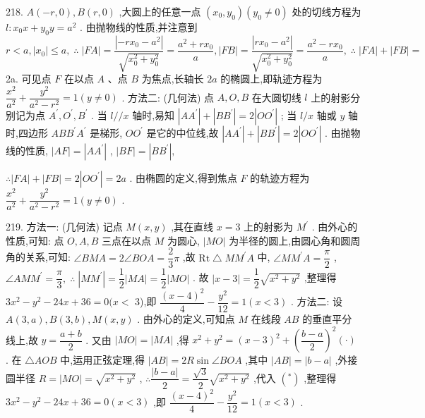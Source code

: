 218. $A\left( {-r,0}\right) ,B\left( {r,0}\right)$ ,大圆上的任意一点 $\left( {{x}_{0},{y}_{0}}\right) \left( {{y}_{0} \neq  0}\right)$ 处的切线方程为 $l : {x}_{0}x + {y}_{0}y = {a}^{2}$ . 由抛物线的性质,并注意到 $r < a,\left| {x}_{0}\right|  \leq  a,\;\therefore \;\left| {FA}\right|  = \dfrac{\left| -r{x}_{0} - {a}^{2}\right| }{\sqrt{{x}_{0}^{2} + {y}_{0}^{2}}} = \dfrac{{a}^{2} + r{x}_{0}}{a},\left| {FB}\right|  = \dfrac{\left| r{x}_{0} - {a}^{2}\right| }{\sqrt{{x}_{0}^{2} + {y}_{0}^{2}}} = \dfrac{{a}^{2} - r{x}_{0}}{a},\;\therefore \;\left| {FA}\right|  + \left| {FB}\right|  =$ 2a. 可见点 $F$ 在以点 $A$ 、点 $B$ 为焦点,长轴长 ${2a}$ 的椭圆上,即轨迹方程为 $\dfrac{{x}^{2}}{{a}^{2}} + \dfrac{{y}^{2}}{{a}^{2} - {r}^{2}} = 1\left( {y \neq  0}\right)$ . 方法二: (几何法) 点 $A,O,B$ 在大圆切线 $l$ 上的射影分别记为点 ${A}^{\prime },{O}^{\prime },{B}^{\prime }$ . 当 $l//x$ 轴时,易知 $\left| {A{A}^{\prime }}\right|  + \left| {B{B}^{\prime }}\right|  = 2\left| {O{O}^{\prime }}\right|$ ; 当 $l/x$ 轴或 $y$ 轴时,四边形 ${AB}{B}^{\prime }{A}^{\prime }$ 是梯形, $O{O}^{\prime }$ 是它的中位线,故 $\left| {A{A}^{\prime }}\right|  + \left| {B{B}^{\prime }}\right|  = 2\left| {O{O}^{\prime }}\right|$ . 由抛物线的性质, $\left| {AF}\right|  = \left| {A{A}^{\prime }}\right|$ , $\left| {BF}\right|  = \left| {B{B}^{\prime }}\right| ,$

$\therefore \left| {FA}\right|  + \left| {FB}\right|  = 2\left| {O{O}^{\prime }}\right|  = {2a}$ . 由椭圆的定义,得到焦点 $F$ 的轨迹方程为 $\dfrac{{x}^{2}}{{a}^{2}} + \dfrac{{y}^{2}}{{a}^{2} - {r}^{2}} = 1\left( {y \neq  0}\right)$ .

219. 方法一: (几何法) 记点 $M\left( {x,y}\right)$ ,其在直线 $x = 3$ 上的射影为 ${M}^{\prime }$ . 由外心的性质,可知: 点 $O,A,B$ 三点在以点 $M$ 为圆心, $\left| {MO}\right|$ 为半径的圆上,由圆心角和圆周角的关系,可知: $\angle {BMA} = 2\angle {BOA} = \dfrac{2}{3}\pi$ ,故 $\mathrm{{Rt}}\bigtriangleup M{M}^{\prime }A$ 中, $\angle M{M}^{\prime }A = \dfrac{\pi }{2}$ , $\angle {AM}{M}^{\prime } = \dfrac{\pi }{3},\;\therefore \;\left| {M{M}^{\prime }}\right|  = \dfrac{1}{2}\left| {MA}\right|  = \dfrac{1}{2}\left| {MO}\right|$ . 故 $\left| {x - 3}\right|  = \dfrac{1}{2}\sqrt{{x}^{2} + {y}^{2}}$ ,整理得 $3{x}^{2} - {y}^{2} - {24x} + {36} = 0(x <$ 3),即 $\dfrac{{\left( x - 4\right) }^{2}}{4} - \dfrac{{y}^{2}}{12} = 1\left( {x < 3}\right)$ . 方法二: 设 $A\left( {3,a}\right) ,B\left( {3,b}\right) ,M\left( {x,y}\right)$ . 由外心的定义,可知点 $M$ 在线段 ${AB}$ 的垂直平分线上,故 $y = \dfrac{a + b}{2}$ . 又由 $\left| {MO}\right|  = \left| {MA}\right|$ ,得 ${x}^{2} + {y}^{2} = {\left( x - 3\right) }^{2} + {\left( \dfrac{b - a}{2}\right) }^{2}\left( \cdot \right)$ . 在 $\bigtriangleup  {AOB}$ 中,运用正弦定理,得 $\left| {AB}\right|  = {2R}\sin \angle {BOA}$ ,其中 $\left| {AB}\right|  = \left| {b - a}\right|$ ,外接圆半径 $R = \left| {MO}\right|  = \sqrt{{x}^{2} + {y}^{2}}$ , $\therefore \dfrac{\left| b - a\right| }{2} = \dfrac{\sqrt{3}}{2}\sqrt{{x}^{2} + {y}^{2}}$ ,代入 $\left( {}^{ * }\right)$ ,整理得 $3{x}^{2} - {y}^{2} - {24x} + {36} = 0\left( {x < 3}\right)$ ,即 $\dfrac{{\left( x - 4\right) }^{2}}{4} - \dfrac{{y}^{2}}{12} = 1\left( {x < 3}\right)$ .

